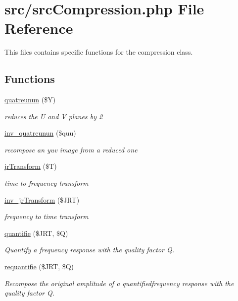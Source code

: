 \hypertarget{src_compression_8php}{
\section{src/src\-Compression.php \-File \-Reference}
\label{src_compression_8php}
}


\-This files contains specific functions for the compression class.  


\subsection*{\-Functions}
\begin{DoxyCompactItemize}
\item 
\hyperlink{src_compression_8php_a96231faad934e6c0fdf54823c822a117}{quatreunun} (\$\-Y)
\begin{DoxyCompactList}\small\item\em reduces the \-U and \-V planes by 2 \end{DoxyCompactList}\item 
\hyperlink{src_compression_8php_ae4c8f783948eb61f0d01064790e274ad}{inv\-\_\-quatreunun} (\$quu)
\begin{DoxyCompactList}\small\item\em recompose an yuv image from a reduced one \end{DoxyCompactList}\item 
\hyperlink{src_compression_8php_a92b3926e343972ab8da5925349684e66}{jr\-Transform} (\$\-T)
\begin{DoxyCompactList}\small\item\em time to frequency transform \end{DoxyCompactList}\item 
\hyperlink{src_compression_8php_ae8da7e16d3d073d296cd7704cec9ee8d}{inv\-\_\-jr\-Transform} (\$\-J\-R\-T)
\begin{DoxyCompactList}\small\item\em frequency to time transform \end{DoxyCompactList}\item 
\hyperlink{src_compression_8php_acb0da5fc24811285cb411acaf7766220}{quantifie} (\$\-J\-R\-T, \$\-Q)
\begin{DoxyCompactList}\small\item\em \-Quantify a frequency response with the quality factor \-Q. \end{DoxyCompactList}\item 
\hyperlink{src_compression_8php_aca441015e4f76d9d3c4a9aabf228e36d}{requantifie} (\$\-J\-R\-T, \$\-Q)
\begin{DoxyCompactList}\small\item\em \-Recompose the original amplitude of a quantifiedfrequency response with the quality factor \-Q. \end{DoxyCompactList}\end{DoxyCompactItemize}


